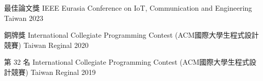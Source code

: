 



\begin{cvhonors}

  \cvhonor
    {最佳論文獎} %
    {IEEE Eurasia Conference on IoT, Communication and Engineering} %
    {Taiwan} %
    {2023} %

\end{cvhonors}




\begin{cvhonors}

  \cvhonor
    {銅牌獎} %
    {International Collegiate Programming Contest (ACM國際大學生程式設計競賽)} %
    {Taiwan Reginal} %
    {2020} %

  \cvhonor
    {第 32 名} %
    {International Collegiate Programming Contest (ACM國際大學生程式設計競賽)} %
    {Taiwan Reginal} %
    {2019} %

\end{cvhonors}
